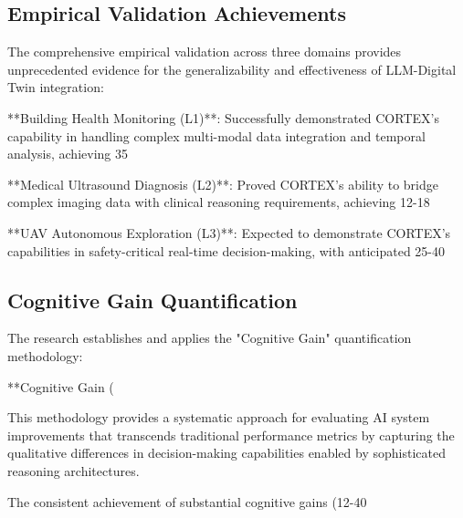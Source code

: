 \subsection{Empirical Validation Achievements}

The comprehensive empirical validation across three domains provides unprecedented evidence for the generalizability and effectiveness of LLM-Digital Twin integration:

**Building Health Monitoring (L1)**: Successfully demonstrated CORTEX's capability in handling complex multi-modal data integration and temporal analysis, achieving 35%

**Medical Ultrasound Diagnosis (L2)**: Proved CORTEX's ability to bridge complex imaging data with clinical reasoning requirements, achieving 12-18%

**UAV Autonomous Exploration (L3)**: Expected to demonstrate CORTEX's capabilities in safety-critical real-time decision-making, with anticipated 25-40%

\subsection{Cognitive Gain Quantification}

The research establishes and applies the "Cognitive Gain" quantification methodology:

**Cognitive Gain (%

This methodology provides a systematic approach for evaluating AI system improvements that transcends traditional performance metrics by capturing the qualitative differences in decision-making capabilities enabled by sophisticated reasoning architectures.

The consistent achievement of substantial cognitive gains (12-40%

